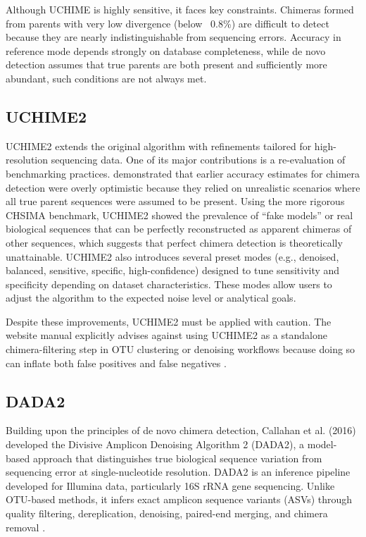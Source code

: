 Although UCHIME is highly sensitive, it faces key constraints. Chimeras formed from parents with very low divergence (below ~0.8\%) are difficult to detect because they are nearly indistinguishable from sequencing errors. Accuracy in reference mode depends strongly on database completeness, while de novo detection assumes that true parents are both present and sufficiently more abundant, such conditions are not always met.

\subsection{UCHIME2}
UCHIME2 extends the original algorithm with refinements tailored for high-resolution sequencing data. One of its major contributions is a re-evaluation of benchmarking practices. \cite{Edgar2016} demonstrated that earlier accuracy estimates for chimera detection were overly optimistic because they relied on unrealistic scenarios where all true parent sequences were assumed to be present. Using the more rigorous CHSIMA benchmark, UCHIME2 showed the prevalence of “fake models” or real biological sequences that can be perfectly reconstructed as apparent chimeras of other sequences, which suggests that perfect chimera detection is theoretically unattainable. UCHIME2 also introduces several preset modes (e.g., denoised, balanced, sensitive, specific, high-confidence) designed to tune sensitivity and specificity depending on dataset characteristics. These modes allow users to adjust the algorithm to the expected noise level or analytical goals.

Despite these improvements, UCHIME2 must be applied with caution. The website manual explicitly advises against using UCHIME2 as a standalone chimera-filtering step in OTU clustering or denoising workflows because doing so can inflate both false positives and false negatives \citep{EdgarManual}. 

\subsection{DADA2}
Building upon the principles of de novo chimera detection, Callahan et al. (2016) developed the Divisive Amplicon Denoising Algorithm 2 (DADA2), a model-based approach that distinguishes true biological sequence variation from sequencing error at single-nucleotide resolution. DADA2 is an inference pipeline developed for Illumina data, particularly 16S rRNA gene sequencing. Unlike OTU-based methods, it infers exact amplicon sequence variants (ASVs) through quality filtering, dereplication, denoising, paired-end merging, and chimera removal \citep{Callahan2016}.

